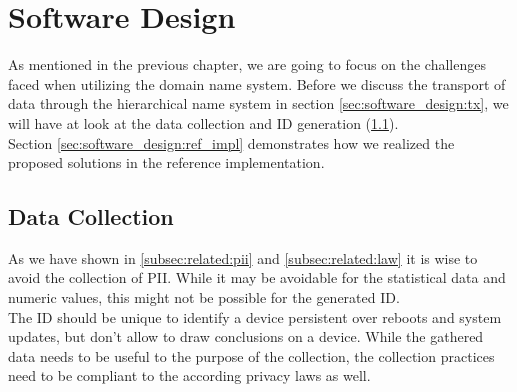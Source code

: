 \chapter{Software Design}
\label{chap:software_design}

As mentioned in the previous chapter, we are going to focus on the challenges faced when utilizing the domain name system. Before we discuss the transport of data through the hierarchical name system in section \ref{sec:software_design:tx}, we will have at look at the data collection and ID generation (\ref{sec:software_design:data_collection}).\\
Section \ref{sec:software_design:ref_impl} demonstrates how we realized the proposed solutions in the reference implementation.


%



\section{Data Collection}
\label{sec:software_design:data_collection}
    As we have shown in \ref{subsec:related:pii} and \ref{subsec:related:law} it is wise to avoid the collection of PII. While it may be avoidable for the statistical data and numeric values, this might not be possible for the generated ID.\\
    The ID should be unique to identify a device persistent over reboots and system updates, but don't allow to draw conclusions on a device.
    While the gathered data needs to be useful to the purpose of the collection, the collection practices need to be compliant to the according privacy laws as well. 
    

